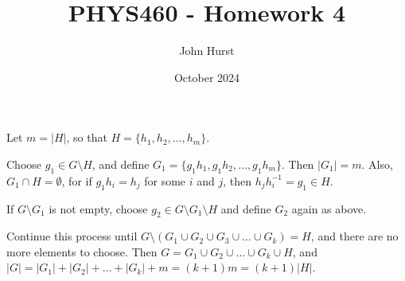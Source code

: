 \documentclass[12pt]{extarticle}
\title{PHYS460 - Homework 4}
\author{John Hurst}
\date{October 2024}
\begin{document}
\maketitle


Let $m=|H|$, so that $H = \{h_1, h_2, \ldots, h_m\}$.

Choose $g_1 \in G \setminus H$, and define $G_1 = \{g_1h_1, g_1h_2, \ldots, g_1h_m\}$.
Then $|G_1| = m$. Also, $G_1 \cap H = \emptyset$, for if $g_1h_i = h_j$ for some $i$ and $j$, then $h_jh_i^{-1}= g_1 \in H$.

If $G\setminus G_1$ is not empty, choose $g_2 \in G\setminus G_1 \setminus H$ and define $G_2$ again as above.

Continue this process until $G \setminus (G_1 \cup G_2 \cup G_3 \cup \ldots \cup G_k) = H$, and there are no more elements to choose.
Then $G = G_1 \cup G_2 \cup \ldots \cup G_k \cup H$, and $|G| = |G_1| + |G_2| + \ldots + |G_k| + m = (k+1)m = (k+1)|H|$.

\end{document}
